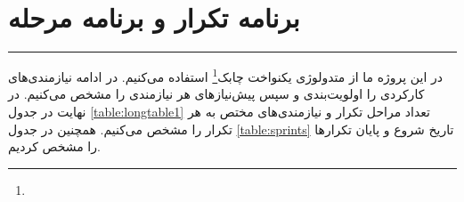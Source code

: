 \documentclass[12pt,a4paper,oneside]{article}
\begin{document}
	\newpage
	\section{برنامه تکرار و برنامه مرحله}
	\vspace{-2em} 
	\par\noindent\rule{\textwidth}{0.72pt}
	
	در این پروژه ما از 
	متدولوژی یکنواخت چابک\footnote{}
	استفاده می‌کنیم. در ادامه نیازمندی‌های کارکردی را اولویت‌بندی و سپس پیش‌نیازهای هر نیازمندی را مشخص می‌کنیم. در نهایت در جدول \ref{table:longtable1} تعداد مراحل تکرار و نیازمندی‌های مختص به هر تکرار را مشخص می‌کنیم. همچنین در جدول \ref{table:sprints} تاریخ شروع و پایان تکرار‌ها را مشخص کردیم.
\end{document}
